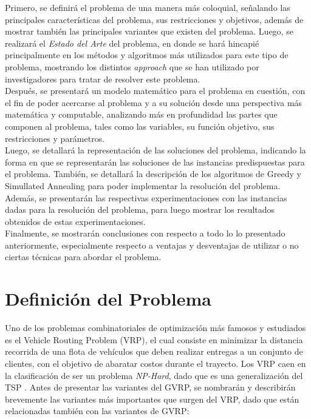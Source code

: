 \documentclass[letter, 10pt]{article}
\begin{document}
Primero, se definirá el problema de una manera más coloquial, señalando las principales características del problema, sus restricciones y objetivos, además de mostrar también las principales variantes que existen del problema. Luego, se realizará el \emph{Estado del Arte} del problema, en donde se hará hincapié principalmente en los métodos y algoritmos más utilizados para este tipo de problema, mostrando los distintos \emph{approach} que se han utilizado por investigadores para tratar de resolver este problema.
\\

Después, se presentará un modelo matemático para el problema en cuestión, con el fin de poder acercarse al problema y a su solución desde una perspectiva más matemática y computable, analizando más en profundidad las partes que componen al problema, tales como las variables, su función objetivo, sus restricciones y parámetros.
\\

Luego, se detallará la representación de las soluciones del problema, indicando la forma en que se representarán las soluciones de las instancias predispuestas para el problema. También, se detallará la descripción de los algoritmos de Greedy y Simullated Annealing para poder implementar la resolución del problema.
\\

Además, se presentarán las respectivas experimentaciones con las instancias dadas para la resolución del problema, para luego mostrar los resultados obtenidos de estas experimentaciones.
\\

Finalmente, se mostrarán conclusiones con respecto a todo lo lo presentado anteriormente, especialmente respecto a ventajas y desventajas de utilizar o no ciertas técnicas para abordar el problema.


\section{Definici\'on del Problema}
\label{definicion}
Uno de los problemas combinatoriales de optimización más famosos y estudiados es el Vehicle Routing Problem (VRP), el cual consiste en minimizar la distancia recorrida de una flota de vehículos que deben realizar entregas a un conjunto de clientes, con el objetivo de abaratar costos durante el trayecto. Los VRP caen en la clasificación de ser un problema \emph{NP-Hard}, dado que es una generalización del TSP \cite{RePEc:inm:ormnsc:v:6:y:1959:i:1:p:80-91}. Antes de presentar las variantes del GVRP, se nombrarán y describirán brevemente las variantes más importantes que surgen del VRP, dado que están relacionadas también con las variantes de GVRP:
\\
\end{document}
